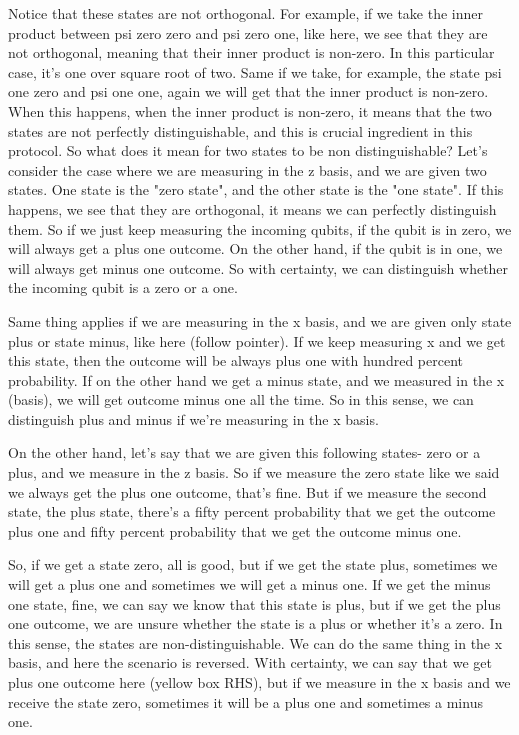 Notice that these states are not orthogonal. For example, if we take the inner product between psi zero zero and psi zero one, like here, we see that they are not orthogonal, meaning that their inner product is non-zero. In this particular case, it's one over square root of two. Same if we take, for example, the state psi one zero and psi one one, again we will get that the inner product is non-zero. When this happens, when the inner product is non-zero, it means that the two states are not perfectly distinguishable, and this is crucial ingredient in this protocol. So what does it mean for two states to be non distinguishable? Let's consider the case where we are measuring in the z basis, and we are given two states. One state is the "zero state", and the other state is the "one state". If this happens, we see that they are orthogonal, it means we can perfectly distinguish them. So if we just keep measuring the incoming qubits, if the qubit is in zero, we will always get a plus one outcome. On the other hand, if the qubit is in one, we will always get minus one outcome. So with certainty, we can distinguish whether the incoming qubit is a zero or a one.

Same thing applies if we are measuring in the x basis, and we are given only state plus or state minus, like here (follow pointer). If we keep measuring x and we get this state, then the outcome will be always plus one with hundred percent probability. If on the other hand we get a minus state, and we measured in the x (basis), we will get outcome minus one all the time. So in this sense, we can distinguish plus and minus if we're measuring in the x basis.

On the other hand, let's say that we are given this following states- zero or a plus, and we measure in the z basis. So if we measure the zero state like we said we always get the plus one outcome, that's fine. But if we measure the second state, the plus state, there's a fifty percent probability that we get the outcome plus one and fifty percent probability that we get the outcome minus one.

So, if we get a state zero, all is good, but if we get the state plus, sometimes we will get a plus one and sometimes we will get a minus one. If we get the minus one state, fine, we can say we know that this state is plus, but if we get the plus one outcome, we are unsure whether the state is a plus or whether it's a zero. In this sense, the states are non-distinguishable. We can do the same thing in the x basis, and here the scenario is reversed. With certainty, we can say that we get plus one outcome here (yellow box RHS), but if we measure in the x basis and we receive the state zero, sometimes it will be a plus one and sometimes a minus one.

